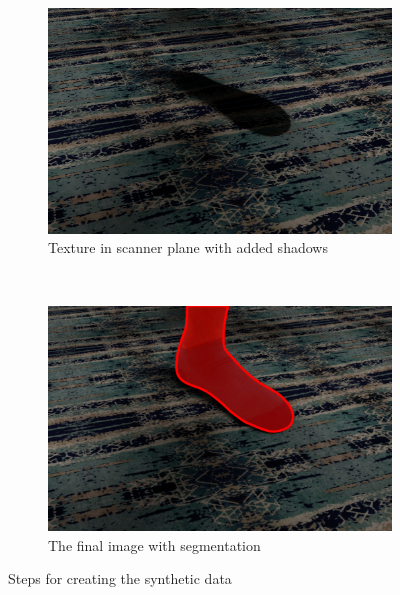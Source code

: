 \documentclass{kththesis}
\begin{document}
\begin{figure}[h]
    \begin{subfigure}[b]{0.45\textwidth}
        \includegraphics[width=\textwidth]{tilted_plan_and_shadow}
        \caption{Texture in scanner plane with added shadows}
        \label{fig:floor_in_plane}
    \end{subfigure}
    ~ %
    \begin{subfigure}[b]{0.45\textwidth}
        \includegraphics[width=\textwidth]{teleported_foot}
        \caption{The final image with segmentation}
        \label{fig:process_res}
    \end{subfigure}
    \caption{Steps for creating the synthetic data}\label{fig:process_synthetic}
\end{figure}
\end{document}
